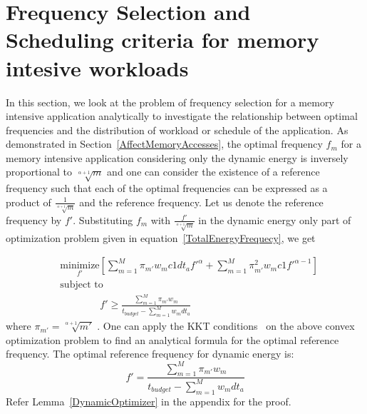 \documentclass[11pt, letterpaper]{article}
\begin{document}
\section{Frequency Selection and Scheduling criteria for memory intesive workloads}\label{SelectionScheduling}
In this section, we look at the problem of frequency selection for a memory intensive application analytically to investigate the relationship between optimal frequencies and the distribution of workload or schedule of the application. As demonstrated in Section~\ref{AffectMemoryAccesses}, the optimal frequency $f_m$ for a memory intensive application considering only the dynamic energy is inversely proportional to $\sqrt[\alpha +1]{m}$ and one can consider the existence of a reference frequency such that each of the optimal frequencies can be expressed as a product of $\frac{1}{\sqrt[\alpha +1]{m}}$ and the reference frequency. Let us denote the reference frequency by $f'$. Substituting $f_m$ with $\frac{f'}{\sqrt[\alpha +1]{m}}$ in the dynamic energy only part of optimization problem given in equation~\ref{TotalEnergyFrequecy}, we get


\begin{displaymath}
\begin{aligned} 
  &\underset{f'}{\text{minimize}}[\sum_{m=1}^{M}\pi_{m'}w_m c1dt_af'^{\alpha} + \sum_{m=1}^{M}\pi_{m'}^2 w_m c1f'^{\alpha-1}]\\
 & \text{subject to}\\
 & \qquad \qquad f' \geq \frac{\sum_{m=1}^{M}\pi_{m'} w_m}{t_{budget} - \sum_{m=1}^{M}w_mdt_a}
\end{aligned}
\end{displaymath}
where $\pi_{m'} =\sqrt[\alpha+1]{m'}$ .
One can apply the KKT conditions~\cite{Boyd} on the above convex optimization problem to find an analytical formula for the optimal reference frequency. The optimal reference frequency for dynamic energy is:
\begin{equation}
f' = \frac{\sum_{m=1}^{M}\pi_{m'}w_m}{t_{budget} - \sum_{m=1}^{M}w_mdt_a}
\end{equation}
Refer Lemma~\ref{DynamicOptimizer} in the appendix for the proof.
\end{document}
